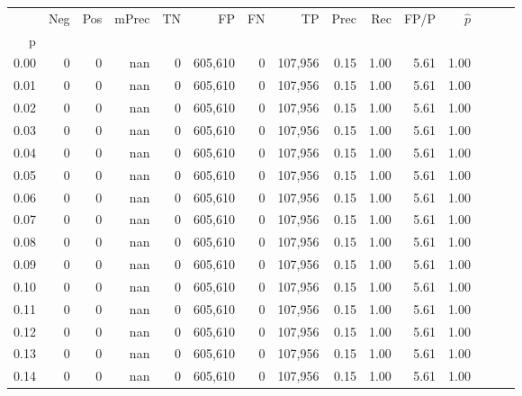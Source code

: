 \begin{tabular}{rrrrrrrrrrrrrrr}
\toprule
{} &     Neg &    Pos & mPrec &       TN &       FP &       FN &       TP &  Prec &   Rec &  FP/P & $\hat{p}$ \\
p    &         &        &       &          &          &          &          &       &       &       &           \\
\midrule
0.00 &       0 &      0 &   nan &        0 &  605,610 &        0 &  107,956 &  0.15 &  1.00 &  5.61 &      1.00 \\
0.01 &       0 &      0 &   nan &        0 &  605,610 &        0 &  107,956 &  0.15 &  1.00 &  5.61 &      1.00 \\
0.02 &       0 &      0 &   nan &        0 &  605,610 &        0 &  107,956 &  0.15 &  1.00 &  5.61 &      1.00 \\
0.03 &       0 &      0 &   nan &        0 &  605,610 &        0 &  107,956 &  0.15 &  1.00 &  5.61 &      1.00 \\
0.04 &       0 &      0 &   nan &        0 &  605,610 &        0 &  107,956 &  0.15 &  1.00 &  5.61 &      1.00 \\
0.05 &       0 &      0 &   nan &        0 &  605,610 &        0 &  107,956 &  0.15 &  1.00 &  5.61 &      1.00 \\
0.06 &       0 &      0 &   nan &        0 &  605,610 &        0 &  107,956 &  0.15 &  1.00 &  5.61 &      1.00 \\
0.07 &       0 &      0 &   nan &        0 &  605,610 &        0 &  107,956 &  0.15 &  1.00 &  5.61 &      1.00 \\
0.08 &       0 &      0 &   nan &        0 &  605,610 &        0 &  107,956 &  0.15 &  1.00 &  5.61 &      1.00 \\
0.09 &       0 &      0 &   nan &        0 &  605,610 &        0 &  107,956 &  0.15 &  1.00 &  5.61 &      1.00 \\
0.10 &       0 &      0 &   nan &        0 &  605,610 &        0 &  107,956 &  0.15 &  1.00 &  5.61 &      1.00 \\
0.11 &       0 &      0 &   nan &        0 &  605,610 &        0 &  107,956 &  0.15 &  1.00 &  5.61 &      1.00 \\
0.12 &       0 &      0 &   nan &        0 &  605,610 &        0 &  107,956 &  0.15 &  1.00 &  5.61 &      1.00 \\
0.13 &       0 &      0 &   nan &        0 &  605,610 &        0 &  107,956 &  0.15 &  1.00 &  5.61 &      1.00 \\
0.14 &       0 &      0 &   nan &        0 &  605,610 &        0 &  107,956 &  0.15 &  1.00 &  5.61 &      1.00 \\

\end{tabular}
